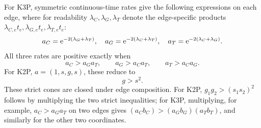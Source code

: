 \documentclass[11pt]{article}
\theoremstyle{remark}\newtheorem{remark}[theorem]{Remark}
\begin{document}
For K3P, symmetric continuous-time rates give the following expressions on each edge, where for readability $\lambda_C,\lambda_G,\lambda_T$ denote the edge-specific products $\lambda_{C,e}t_e,\lambda_{G,e}t_e,\lambda_{T,e}t_e$:
\[
a_C=\mathrm e^{-2(\lambda_G+\lambda_T)},\quad a_G=\mathrm e^{-2(\lambda_C+\lambda_T)},\quad a_T=\mathrm e^{-2(\lambda_C+\lambda_G)}.
\]
All three rates are positive exactly when
\begin{equation}\label{eq:k3p-ct}a_C>a_Ga_T,\qquad a_G>a_Ca_T,\qquad a_T>a_Ca_G.\end{equation}
For K2P, $a=(1,s,g,s)$, these reduce to
\begin{equation}\label{eq:k2p-ct}g>s^2.\end{equation}
These strict cones are closed under edge composition. For K2P,
$g_1g_2>(s_1s_2)^2$ follows by multiplying the two strict inequalities; for
K3P, multiplying, for example, $a_C>a_Ga_T$ on two edges gives
$(a_Cb_C)>(a_Gb_G)(a_Tb_T)$, and similarly for the other two coordinates.
\end{document}
